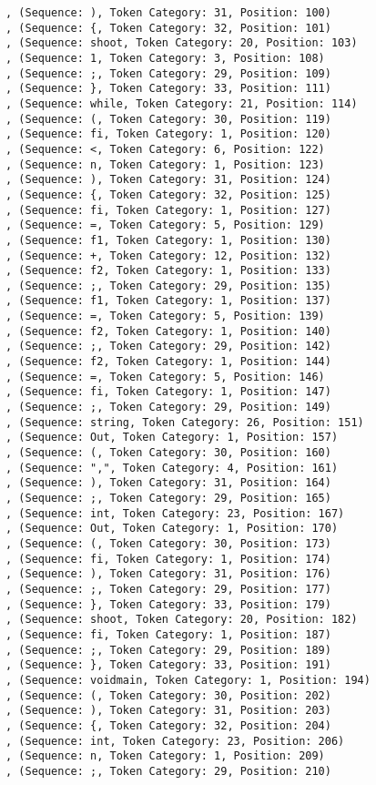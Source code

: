 \documentclass[a4paper, 12pt, article]{memoir}
\begin{document}
\begin{lstlisting}
, (Sequence: ), Token Category: 31, Position: 100)
, (Sequence: {, Token Category: 32, Position: 101)
, (Sequence: shoot, Token Category: 20, Position: 103)
, (Sequence: 1, Token Category: 3, Position: 108)
, (Sequence: ;, Token Category: 29, Position: 109)
, (Sequence: }, Token Category: 33, Position: 111)
, (Sequence: while, Token Category: 21, Position: 114)
, (Sequence: (, Token Category: 30, Position: 119)
, (Sequence: fi, Token Category: 1, Position: 120)
, (Sequence: <, Token Category: 6, Position: 122)
, (Sequence: n, Token Category: 1, Position: 123)
, (Sequence: ), Token Category: 31, Position: 124)
, (Sequence: {, Token Category: 32, Position: 125)
, (Sequence: fi, Token Category: 1, Position: 127)
, (Sequence: =, Token Category: 5, Position: 129)
, (Sequence: f1, Token Category: 1, Position: 130)
, (Sequence: +, Token Category: 12, Position: 132)
, (Sequence: f2, Token Category: 1, Position: 133)
, (Sequence: ;, Token Category: 29, Position: 135)
, (Sequence: f1, Token Category: 1, Position: 137)
, (Sequence: =, Token Category: 5, Position: 139)
, (Sequence: f2, Token Category: 1, Position: 140)
, (Sequence: ;, Token Category: 29, Position: 142)
, (Sequence: f2, Token Category: 1, Position: 144)
, (Sequence: =, Token Category: 5, Position: 146)
, (Sequence: fi, Token Category: 1, Position: 147)
, (Sequence: ;, Token Category: 29, Position: 149)
, (Sequence: string, Token Category: 26, Position: 151)
, (Sequence: Out, Token Category: 1, Position: 157)
, (Sequence: (, Token Category: 30, Position: 160)
, (Sequence: ",", Token Category: 4, Position: 161)
, (Sequence: ), Token Category: 31, Position: 164)
, (Sequence: ;, Token Category: 29, Position: 165)
, (Sequence: int, Token Category: 23, Position: 167)
, (Sequence: Out, Token Category: 1, Position: 170)
, (Sequence: (, Token Category: 30, Position: 173)
, (Sequence: fi, Token Category: 1, Position: 174)
, (Sequence: ), Token Category: 31, Position: 176)
, (Sequence: ;, Token Category: 29, Position: 177)
, (Sequence: }, Token Category: 33, Position: 179)
, (Sequence: shoot, Token Category: 20, Position: 182)
, (Sequence: fi, Token Category: 1, Position: 187)
, (Sequence: ;, Token Category: 29, Position: 189)
, (Sequence: }, Token Category: 33, Position: 191)
, (Sequence: voidmain, Token Category: 1, Position: 194)
, (Sequence: (, Token Category: 30, Position: 202)
, (Sequence: ), Token Category: 31, Position: 203)
, (Sequence: {, Token Category: 32, Position: 204)
, (Sequence: int, Token Category: 23, Position: 206)
, (Sequence: n, Token Category: 1, Position: 209)
, (Sequence: ;, Token Category: 29, Position: 210)

\end{lstlisting}
\end{document}
